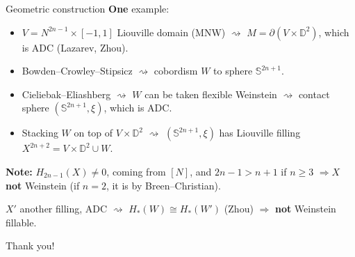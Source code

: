 \documentclass{beamer}
\begin{document}
\begin{frame}{Geometric construction}
    \textbf{One} example: 

    \medskip

    \begin{itemize}
    
    \item $V=N^{2n-1}\times [-1,1]$ Liouville domain (MNW) $\rightsquigarrow$ $M=\partial (V \times \mathbb D^2)$, which is ADC (Lazarev, Zhou). 

    \medskip

    \pause
    
    \item Bowden--Crowley--Stipsicz  $\rightsquigarrow$ cobordism $W$ to sphere $\mathbb S^{2n+1}$.

    \medskip

    \pause

    \item Cieliebak--Eliashberg  $\rightsquigarrow$ $W$ can be taken flexible Weinstein $\rightsquigarrow$ contact sphere $(\mathbb S^{2n+1},\xi)$, which is ADC.

    \medskip

    \pause

    \item Stacking $W$ on top of $V\times \mathbb D^2$ $\rightsquigarrow$ $(\mathbb S^{2n+1},\xi)$ has Liouville filling $X^{2n+2}=V\times \mathbb D^2\cup W$. 

\end{itemize}

    \medskip 

    \pause
    
\begin{exampleblock}{}
    \textbf{Note:} $H_{2n-1}(X)\neq 0$, coming from $[N]$, and $2n-1>n+1$ if $n\geq 3$ $\Rightarrow X$ \textbf{not} Weinstein (if $n=2$, it is by Breen--Christian).
\end{exampleblock}

    \pause

     \medskip 

    $X'$ another filling, ADC $\rightsquigarrow$ $H_*(W)\cong H_*(W')$ (Zhou) $\Rightarrow$ \textbf{not} Weinstein fillable. 
\end{frame}

\begin{frame}
\centering
Thank you!
    
\end{frame}
\end{document}
